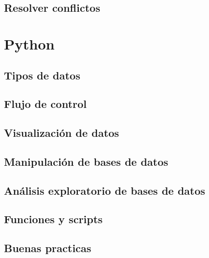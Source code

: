 \documentclass[
]{book}
\begin{document}
\hypertarget{resolver-conflictos}{%
\section{Resolver conflictos}\label{resolver-conflictos}}

\hypertarget{python}{%
\chapter{Python}\label{python}}

\hypertarget{tipos-de-datos}{%
\section{Tipos de datos}\label{tipos-de-datos}}

\hypertarget{flujo-de-control}{%
\section{Flujo de control}\label{flujo-de-control}}

\hypertarget{visualizaciuxf3n-de-datos}{%
\section{Visualización de datos}\label{visualizaciuxf3n-de-datos}}

\hypertarget{manipulaciuxf3n-de-bases-de-datos}{%
\section{Manipulación de bases de datos}\label{manipulaciuxf3n-de-bases-de-datos}}

\hypertarget{anuxe1lisis-exploratorio-de-bases-de-datos}{%
\section{Análisis exploratorio de bases de datos}\label{anuxe1lisis-exploratorio-de-bases-de-datos}}

\hypertarget{funciones-y-scripts}{%
\section{Funciones y scripts}\label{funciones-y-scripts}}

\hypertarget{buenas-practicas}{%
\section{Buenas practicas}\label{buenas-practicas}}
\end{document}

